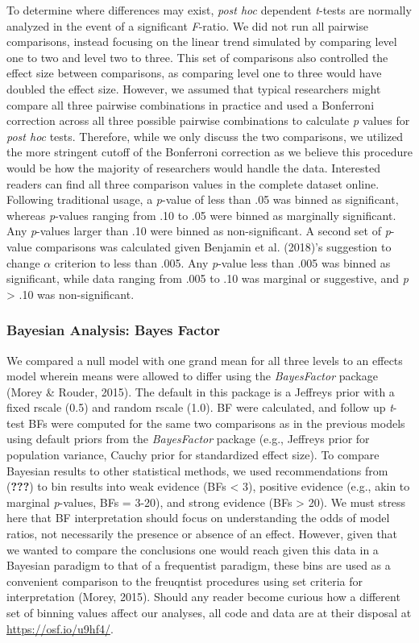 \documentclass[english,man]{apa6}
\theoremstyle{definition}
\theoremstyle{definition}
\theoremstyle{definition}
\theoremstyle{remark}
\begin{document}
To determine where differences may exist, \emph{post hoc} dependent
\emph{t}-tests are normally analyzed in the event of a significant
\emph{F}-ratio. We did not run all pairwise comparisons, instead
focusing on the linear trend simulated by comparing level one to two and
level two to three. This set of comparisons also controlled the effect
size between comparisons, as comparing level one to three would have
doubled the effect size. However, we assumed that typical researchers
might compare all three pairwise combinations in practice and used a
Bonferroni correction across all three possible pairwise combinations to
calculate \emph{p} values for \emph{post hoc} tests. Therefore, while we
only discuss the two comparisons, we utilized the more stringent cutoff
of the Bonferroni correction as we believe this procedure would be how
the majority of researchers would handle the data. Interested readers
can find all three comparison values in the complete dataset online.
Following traditional usage, a \emph{p}-value of less than .05 was
binned as significant, whereas \emph{p}-values ranging from .10 to .05
were binned as marginally significant. Any \emph{p}-values larger than
.10 were binned as non-significant. A second set of \emph{p}-value
comparisons was calculated given Benjamin et al. (2018)'s suggestion to
change \(\alpha\) criterion to less than .005. Any \emph{p}-value less
than .005 was binned as significant, while data ranging from .005 to .10
was marginal or suggestive, and \emph{p} \textgreater{} .10 was
non-significant.

\subsubsection{Bayesian Analysis: Bayes
Factor}\label{bayesian-analysis-bayes-factor}

We compared a null model with one grand mean for all three levels to an
effects model wherein means were allowed to differ using the
\emph{BayesFactor} package (Morey \& Rouder, 2015). The default in this
package is a Jeffreys prior with a fixed rscale (0.5) and random rscale
(1.0). BF were calculated, and follow up \emph{t}-test BFs were computed
for the same two comparisons as in the previous models using default
priors from the \emph{BayesFactor} package (e.g., Jeffreys prior for
population variance, Cauchy prior for standardized effect size). To
compare Bayesian results to other statistical methods, we used
recommendations from ({\textbf{???}}) to bin results into weak evidence
(BFs \textless{} 3), positive evidence (e.g., akin to marginal
\emph{p}-values, BFs = 3-20), and strong evidence (BFs \textgreater{}
20). We must stress here that BF interpretation should focus on
understanding the odds of model ratios, not necessarily the presence or
absence of an effect. However, given that we wanted to compare the
conclusions one would reach given this data in a Bayesian paradigm to
that of a frequentist paradigm, these bins are used as a convenient
comparison to the freuqntist procedures using set criteria for
interpretation (Morey, 2015). Should any reader become curious how a
different set of binning values affect our analyses, all code and data
are at their disposal at \url{https://osf.io/u9hf4/}.
\end{document}
